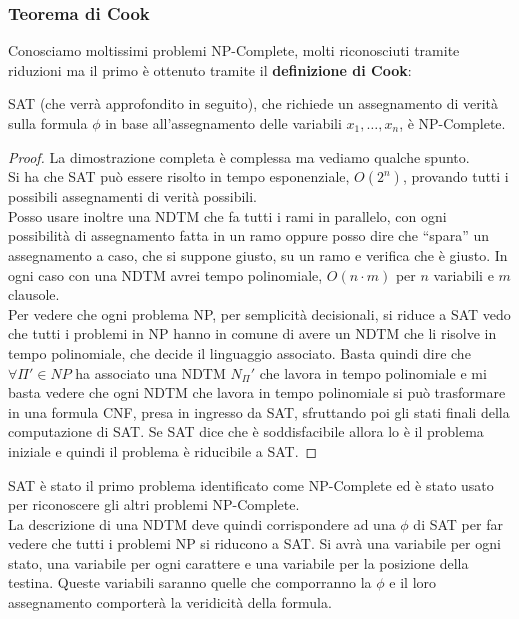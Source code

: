 \subsubsection{Teorema di Cook}
Conosciamo moltissimi problemi NP-Complete, molti riconosciuti tramite riduzioni
ma il primo è ottenuto tramite il \textbf{definizione di Cook}:
\begin{definizione}
  SAT (che verrà approfondito in seguito), che richiede un assegnamento di verità sulla
  formula $\phi$ in base all'assegnamento delle variabili $x_1,\ldots,x_n$, è
  NP-Complete. 
\end{definizione}
\begin{proof}
  La dimostrazione completa è complessa ma vediamo qualche spunto.\\
  Si ha che SAT può essere risolto in tempo esponenziale, $O(2^n)$, provando
  tutti i possibili assegnamenti di verità possibili.\\
  Posso usare inoltre una NDTM che fa tutti i rami in parallelo, con ogni
  possibilità di assegnamento fatta in un ramo oppure posso dire che ``spara''
  un assegnamento a caso, che si suppone giusto, su un ramo e verifica che è
  giusto. In ogni caso con una NDTM avrei tempo polinomiale, $O(n\cdot m)$ per
  $n$ variabili e $m$ clausole.\\
  Per vedere che ogni problema NP, per semplicità decisionali, si riduce a SAT
  vedo che tutti i problemi in NP hanno in comune di avere un NDTM che li
  risolve in tempo polinomiale, che decide il linguaggio associato. Basta quindi
  dire che $\forall\Pi'\in NP$ ha associato una NDTM $N_\Pi'$ che lavora in
  tempo polinomiale e mi basta vedere che ogni NDTM che lavora in tempo
  polinomiale si può trasformare in una formula CNF, presa in ingresso da SAT,
  sfruttando poi gli stati finali della computazione di SAT. Se SAT dice che è
  soddisfacibile allora lo è il problema iniziale e quindi il problema è
  riducibile a SAT.
\end{proof}
SAT è stato il primo problema identificato come NP-Complete ed è stato usato per
riconoscere gli altri problemi NP-Complete.\\
La descrizione di una NDTM deve quindi corrispondere ad una $\phi$ di SAT per
far vedere che tutti i problemi NP si riducono a SAT. Si avrà una variabile per
ogni stato, una variabile per ogni carattere e una variabile per la posizione
della testina. Queste variabili saranno quelle che comporranno la $\phi$ e il
loro assegnamento comporterà la veridicità della formula.\\
